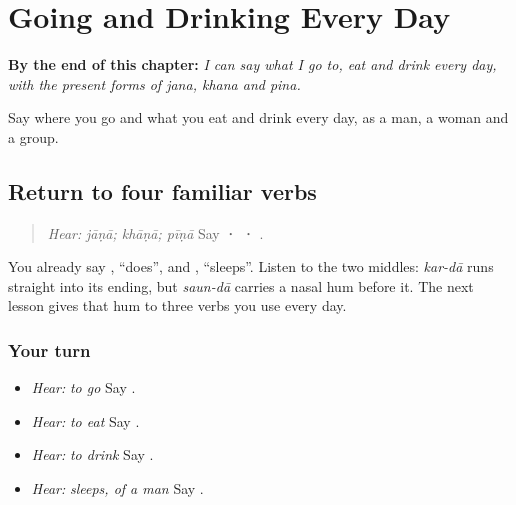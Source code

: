 
\chapter{Going and Drinking Every Day}
\label{ch:pa-a2-vowel-stem}

\begin{chapteropening}
\textbf{By the end of this chapter:} \emph{I can say what I go to, eat and drink every day, with the present forms of jana, khana and pina.}

Say where you go and what you eat and drink every day, as a man, a woman and a group.
\end{chapteropening}

\section[\texorpdfstring{\pa{ਜਾਣਾ} · \pa{ਖਾਣਾ} … (jāṇā · khāṇā …)}{ਜਾਣਾ · ਖਾਣਾ … (jāṇā · khāṇā …)}]{Return to four familiar verbs}

\label{lesson:PA-C211-verbs-return}



\begin{quote}
\emph{Hear:} \emph{jāṇā; khāṇā; pīṇā} Say \textbf{ ·  · }.
\end{quote}

\begin{grammarlens}[title={Grammar Lens}]
You already say \textbf{}, \textquotedblleft{}does\textquotedblright{}, and \textbf{}, \textquotedblleft{}sleeps\textquotedblright{}. Listen to the two middles: \emph{kar-dā} runs straight into its ending, but \emph{saun-dā} carries a nasal hum before it. The next lesson gives that hum to three verbs you use every day.
\end{grammarlens}

\subsection*{Your turn}
\begin{itemize}
\raggedright
  \item \emph{Hear:} \emph{to go} Say \textbf{}.
  \item \emph{Hear:} \emph{to eat} Say \textbf{}.
  \item \emph{Hear:} \emph{to drink} Say \textbf{}.
  \item \emph{Hear:} \emph{sleeps, of a man} Say \textbf{}.
\end{itemize}

